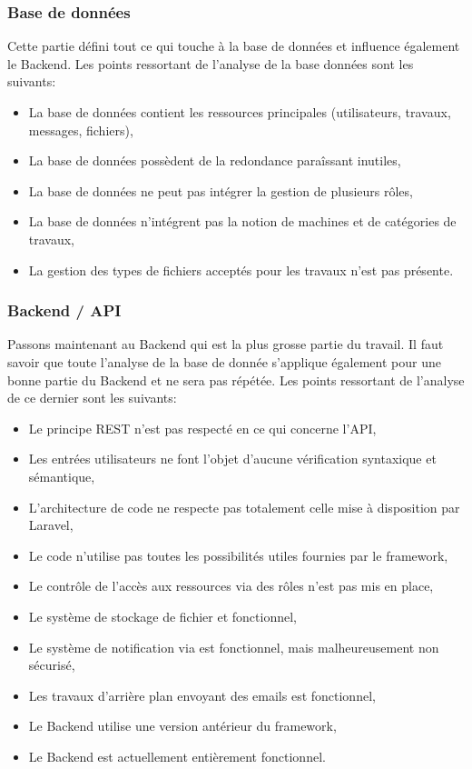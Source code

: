 \documentclass[
    iai, %
    il, %
]{heig-tb}
\begin{document}
\subsubsection{Base de données}
Cette partie défini tout ce qui touche à la base de données et influence également le Backend.\newline
Les points ressortant de l'analyse de la base données sont les suivants:
\begin{itemize}
    \item La base de données contient les ressources principales (utilisateurs, travaux, messages, fichiers),
    \item La base de données possèdent de la redondance paraîssant inutiles,
    \item La base de données ne peut pas intégrer la gestion de plusieurs rôles,
    \item La base de données n'intégrent pas la notion de machines et de catégories de travaux,
    \item La gestion des types de fichiers acceptés pour les travaux n'est pas présente.
\end{itemize}

\subsubsection{Backend / API}
Passons maintenant au Backend qui est la plus grosse partie du travail.\newline
Il faut savoir que toute l'analyse de la base de donnée s'applique également pour une bonne partie du Backend et ne sera pas répétée.\newline
Les points ressortant de l'analyse de ce dernier sont les suivants:
\begin{itemize}
    \item Le principe REST n'est pas respecté en ce qui concerne l'API,
    \item Les entrées utilisateurs ne font l'objet d'aucune vérification syntaxique et sémantique,
    \item L'architecture de code ne respecte pas totalement celle mise à disposition par Laravel,
    \item Le code n'utilise pas toutes les possibilités utiles fournies par le framework,
    \item Le contrôle de l'accès aux ressources via des rôles n'est pas mis en place,
    \item Le système de stockage de fichier et fonctionnel,
    \item Le système de notification via est fonctionnel, mais malheureusement non sécurisé,
    \item Les travaux d'arrière plan envoyant des emails est fonctionnel,
    \item Le Backend utilise une version antérieur du framework,
    \item Le Backend est actuellement entièrement fonctionnel.
\end{itemize}
\end{document}
